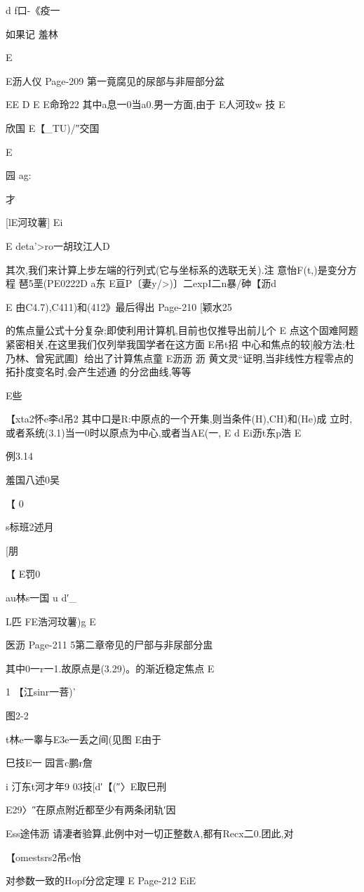 {{{{{{{{{{{{d
f口-《疫一

如果记
羞林

E

E沥人仪
Page-209
第一竟腐见的尿部与非屉部分盆

EE
D
E
E命玲22
其中a息一0当a0.男一方面,由于
E人河玟w
技
E

欣国
E【_TU)/″交国

E

园
ag:

才

[lE河玟薯]
Ei

E
deta'>ro一胡玟江人D

其次,我们来计算上步左端的行列式(它与坐标系的选联无关).注
意怡F(t,)是变分方程
琶5垩(PE0222D
a东
E亘P〔妻y/>)〕二expI二n暴/砷【沥d

E
由C4.7),C411)和(412》最后得出
Page-210
[颖水25

的焦点量公式十分复杂;即使利用计算机,目前也仅推导出前儿个
E
点这个固难阿题紧密相关,在这里我们仅列举我国学者在这方面
E吊t招
中心和焦点的较]般方法;杜乃林、曾宪武圃〕给出了计算焦点童
E沥沥
沥
黄文灵“证明,当非线性方程零点的拓扑度变名时,会产生述通
的分岔曲线,等等

E些

【xta2怀e李d吊2
其中口是R:中原点的一个开集,则当条件(H),CH)和(He)成
立时,或者系统(3.1)当一0时以原点为中心,或者当AE(一,
E
d
Ei沥t东p浩
E

例3.14

羞国八述0吴

【
0

s标班2述月

[朋

【
E罚0

au林s一国
u
d′_

L匹
FE浩河玟薯)g
E

医沥
Page-211
5第二章帝见的尸部与非尿部分盅

其中0一r一1.故原点是(3.29)。的渐近稳定焦点
E

1
【江sinr一菩)'

图2-2

t林e一睾与E3e一丢之间(见图
E由于

巳技E一
园言c鹏r詹

i
汀东t河才年9
03技[d′【(″〉E取巳刑

E29〉″在原点附近都至少有两条闭轨′因

Ess途伟沥
请凄者验算,此例中对一切正整数A,都有Recx二0.团此,对

【omestsrs2吊e怡

对参数一致的Hopf分岔定理
E
Page-212
EiE

}}}}}}}}}}}}
